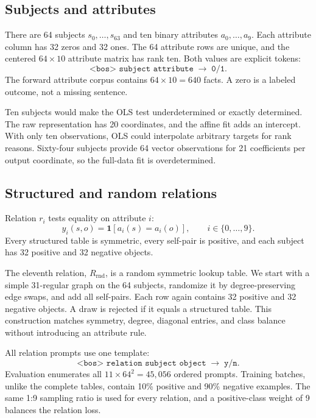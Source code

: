 \documentclass[11pt]{article}
\newcommand{\Rrnd}{R_{\mathrm{rnd}}}
\begin{document}
\subsection{Subjects and attributes}

There are 64 subjects $s_0,\ldots,s_{63}$ and ten binary attributes
$a_0,\ldots,a_9$.  Each attribute column has 32 zeros and 32 ones.  The 64
attribute rows are unique, and the centered $64\times10$ attribute matrix has
rank ten.  Both values are explicit tokens:
\[
  \texttt{<bos> subject attribute} \;\longrightarrow\; \texttt{0/1}.
\]
The forward attribute corpus contains $64\times10=640$ facts.  A zero is a
labeled outcome, not a missing sentence.

Ten subjects would make the OLS test underdetermined or exactly determined.
The raw representation has 20 coordinates, and the affine fit adds an
intercept.  With only ten observations, OLS could interpolate arbitrary targets
for rank reasons.  Sixty-four subjects provide 64 vector observations for 21
coefficients per output coordinate, so the full-data fit is overdetermined.

\subsection{Structured and random relations}

Relation $r_i$ tests equality on attribute $i$:
\[
  y_i(s,o)=\mathbf 1[a_i(s)=a_i(o)],
  \qquad i\in\{0,\ldots,9\}.
\]
Every structured table is symmetric, every self-pair is positive, and each
subject has 32 positive and 32 negative objects.

The eleventh relation, $\Rrnd$, is a random symmetric lookup table.  We start
with a simple 31-regular graph on the 64 subjects, randomize it by
degree-preserving edge swaps, and add all self-pairs.  Each row again contains
32 positive and 32 negative objects.  A draw is rejected if it equals a
structured table.  This construction matches symmetry, degree, diagonal
entries, and class balance without introducing an attribute rule.

All relation prompts use one template:
\[
  \texttt{<bos> relation subject object} \;\longrightarrow\; \texttt{y/n}.
\]
Evaluation enumerates all $11\times64^2=45{,}056$ ordered prompts.  Training
batches, unlike the complete tables, contain 10\% positive and 90\% negative
examples.  The same 1:9 sampling ratio is used for every relation, and a
positive-class weight of 9 balances the relation loss.
\end{document}
